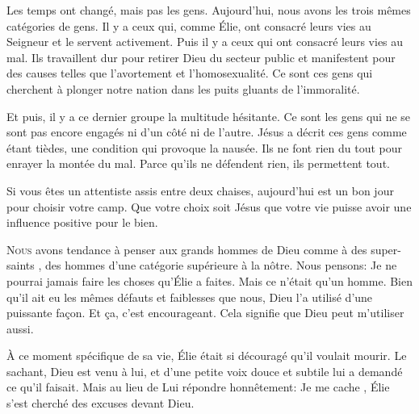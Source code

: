 Les temps ont changé, mais pas les gens.
 Aujourd'hui, nous avons les trois mêmes catégories de gens.
 Il y a ceux qui, comme Élie, ont consacré leurs vies au Seigneur
 et le servent activement.
 Puis il y a ceux qui ont consacré leurs vies au mal.
 Ils travaillent dur pour retirer Dieu du secteur public
 et manifestent pour des causes telles que l'avortement et l'homosexualité.
 Ce sont ces gens qui cherchent à plonger notre nation
 dans les puits gluants de l'immoralité. 


Et puis, il y a ce dernier groupe \ocadr la multitude hésitante.
 Ce sont les gens qui ne se sont pas encore engagés
 ni d'un côté ni de l'autre. Jésus a décrit ces gens comme étant tièdes,
 une condition qui provoque la nausée.
 Ils ne font rien du tout pour enrayer la montée du mal.
 Parce qu'ils ne défendent rien, ils permettent tout. 

Si vous êtes un attentiste assis entre deux chaises,
 aujourd'hui est un bon jour pour choisir votre camp.
 Que votre choix soit Jésus
 \ocadr que votre vie puisse avoir une influence positive pour le bien. 

\dvrule






\lettrine{N}{ous} avons tendance à penser aux grands hommes de Dieu
 comme à des \Og super-saints \Fg{},
 des hommes d'une catégorie supérieure à la nôtre. Nous pensons:
 \Og Je ne pourrai jamais faire les choses qu'Élie a faites. \Fg{}
 Mais ce n'était qu'un homme. Bien qu'il ait eu les mêmes défauts
 et faiblesses que nous, Dieu l'a utilisé d'une puissante fa\c{c}on.
 Et \c{c}a, c'est encourageant. Cela signifie que Dieu peut m'utiliser aussi.

\`A ce moment spécifique de sa vie, Élie était si découragé
 qu'il voulait mourir. Le sachant, Dieu est venu à lui,
 et d'une petite voix douce et subtile lui a demandé ce qu'il faisait.
 Mais au lieu de Lui répondre honnêtement: \Og Je me cache \Fg{},
 Élie s'est cherché des excuses devant Dieu. 

